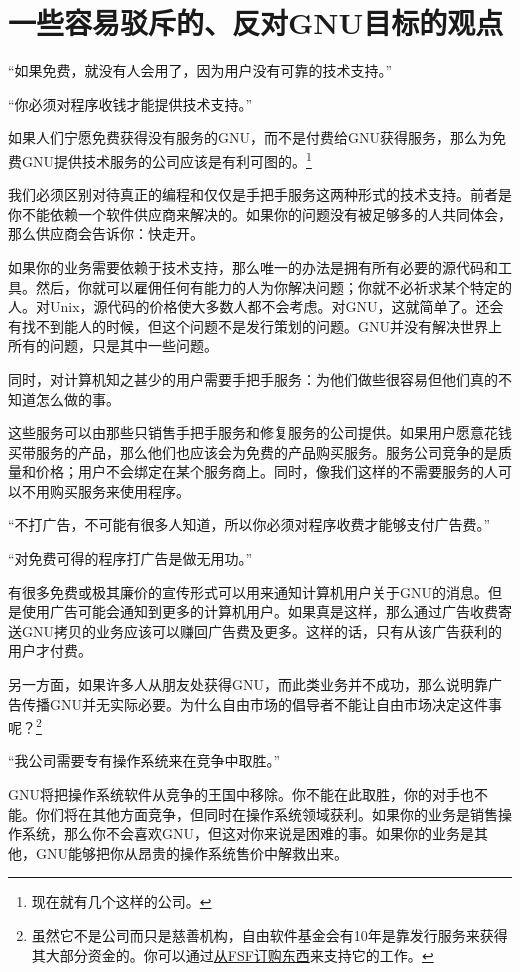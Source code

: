 \section{一些容易驳斥的、反对GNU目标的观点}
“如果免费，就没有人会用了，因为用户没有可靠的技术支持。”\par
“你必须对程序收钱才能提供技术支持。”\par
如果人们宁愿免费获得没有服务的GNU，而不是付费给GNU获得服务，那么为免费GNU提供技术服务的公司应该是有利可图的。\footnote{现在就有几个这样的公司。}\par
我们必须区别对待真正的编程和仅仅是手把手服务这两种形式的技术支持。前者是你不能依赖一个软件供应商来解决的。如果你的问题没有被足够多的人共同体会，那么供应商会告诉你：快走开。\par
如果你的业务需要依赖于技术支持，那么唯一的办法是拥有所有必要的源代码和工具。然后，你就可以雇佣任何有能力的人为你解决问题；你就不必祈求某个特定的人。对Unix，源代码的价格使大多数人都不会考虑。对GNU，这就简单了。还会有找不到能人的时候，但这个问题不是发行策划的问题。GNU并没有解决世界上所有的问题，只是其中一些问题。\par
同时，对计算机知之甚少的用户需要手把手服务：为他们做些很容易但他们真的不知道怎么做的事。\par
这些服务可以由那些只销售手把手服务和修复服务的公司提供。如果用户愿意花钱买带服务的产品，那么他们也应该会为免费的产品购买服务。服务公司竞争的是质量和价格；用户不会绑定在某个服务商上。同时，像我们这样的不需要服务的人可以不用购买服务来使用程序。\par
“不打广告，不可能有很多人知道，所以你必须对程序收费才能够支付广告费。”\par
“对免费可得的程序打广告是做无用功。”\par
有很多免费或极其廉价的宣传形式可以用来通知计算机用户关于GNU的消息。但是使用广告可能会通知到更多的计算机用户。如果真是这样，那么通过广告收费寄送GNU拷贝的业务应该可以赚回广告费及更多。这样的话，只有从该广告获利的用户才付费。\par
另一方面，如果许多人从朋友处获得GNU，而此类业务并不成功，那么说明靠广告传播GNU并无实际必要。为什么自由市场的倡导者不能让自由市场决定这件事呢？\footnote{虽然它不是公司而只是慈善机构，自由软件基金会有10年是靠发行服务来获得其大部分资金的。你可以通过\href{http://www.gnu.org/order/order.html}{从FSF订购东西}来支持它的工作。 }\par
“我公司需要专有操作系统来在竞争中取胜。”\par
GNU将把操作系统软件从竞争的王国中移除。你不能在此取胜，你的对手也不能。你们将在其他方面竞争，但同时在操作系统领域获利。如果你的业务是销售操作系统，那么你不会喜欢GNU，但这对你来说是困难的事。如果你的业务是其他，GNU能够把你从昂贵的操作系统售价中解救出来。\par
